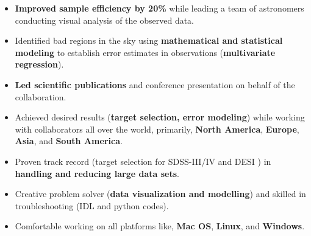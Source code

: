 \documentclass[letterpaper,11pt]{article}
\begin{document}
\begin{itemize}
\item 
\textbf{Improved sample efficiency by 20\%} while leading a team of astronomers conducting visual
analysis of the observed data.\vspace*{-5pt}

\item 
Identified bad regions in the sky using \textbf{mathematical and statistical modeling} to establish
error estimates in observations (\textbf{multivariate regression}).\vspace*{-5pt}

\item 
\textbf{Led scientific publications} and conference presentation on behalf of the collaboration.\vspace*{-5pt}

\item 
Achieved desired results (\textbf{target selection, error modeling}) while working with collaborators
all over the world, primarily, \textbf{North America}, \textbf{Europe}, \textbf{Asia}, and \textbf{South America}.\vspace*{-5pt}

\item 
Proven track record (target selection for SDSS-III/IV and DESI ) in \textbf{handling and reducing large
data sets}.\vspace*{-5pt}

\item 
Creative problem solver (\textbf{data visualization and modelling}) and skilled in troubleshooting (IDL
and python codes).\vspace*{-5pt}

\item 
Comfortable working on all platforms like, \textbf{Mac OS}, \textbf{Linux}, and \textbf{Windows}.\vspace*{-5pt}



\end{itemize}\vspace*{-18pt}
\end{document}
